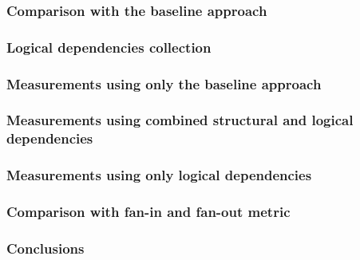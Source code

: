 \documentclass{beamer}
\begin{document}

 \begin{frame}
\frametitle{Comparison with the baseline approach}
 

\end{frame}


 \begin{frame}
\frametitle{Logical dependencies collection}
 

\end{frame}


 \begin{frame}
\frametitle{Measurements using only the baseline approach}
 

\end{frame}


 \begin{frame}
\frametitle{Measurements using combined structural and logical dependencies}
 

\end{frame}


 \begin{frame}
\frametitle{Measurements using only logical dependencies}
 

\end{frame}


 \begin{frame}
\frametitle{Comparison with fan-in and fan-out metric}
 

\end{frame}


 \begin{frame}
\frametitle{Conclusions}
 

\end{frame}
\end{document}
